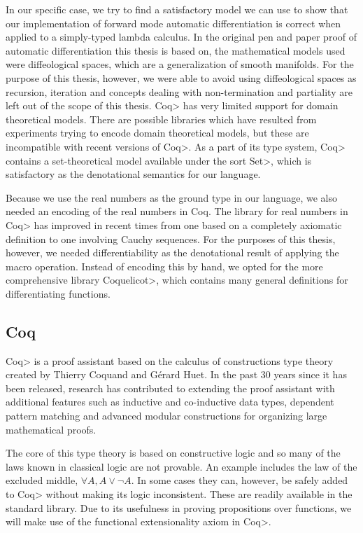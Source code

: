 \documentclass[11pt, final]{article}
\begin{document}
In our specific case, we try to find a satisfactory model we can use to show that our implementation of forward mode automatic differentiation is correct when applied to a simply-typed lambda calculus.
In the original pen and paper proof of automatic differentiation this thesis is based on, the mathematical models used were diffeological spaces, which are a generalization of smooth manifolds.
For the purpose of this thesis, however, we were able to avoid using diffeological spaces as recursion, iteration and concepts dealing with non-termination and partiality are left out of the scope of this thesis.
\<Coq> has very limited support for domain theoretical models.
There are possible libraries which have resulted from experiments trying to encode domain theoretical models\cite{Benton2009}\cite{Dockins2014}, but these are incompatible with recent versions of \<Coq>.
As a part of its type system, \<Coq> contains a set-theoretical model available under the sort \<Set>, which is satisfactory as the denotational semantics for our language.

Because we use the real numbers as the ground type in our language, we also needed an encoding of the real numbers in Coq. The library for real numbers in \<Coq> has improved in recent times from one based on a completely axiomatic definition to one involving Cauchy sequences. For the purposes of this thesis, however, we needed differentiability as the denotational result of applying the macro operation. Instead of encoding this by hand, we opted for the more comprehensive library \<Coquelicot>\cite{Boldo2015CoquelicotAU}, which contains many general definitions for differentiating functions.


\subsection{Coq}

\<Coq> is a proof assistant based on the calculus of constructions type theory created by Thierry Coquand and G\'{e}rard Huet\cite{Coquand1988}.
In the past 30 years since it has been released, research has contributed to extending the proof assistant with additional features such as inductive and co-inductive data types\cite{Coquand1990}, dependent pattern matching\cite{Sozeau2010} and advanced modular constructions for organizing large mathematical proofs\cite{Sozeau2008}\cite{Mahboubi2013}.

The core of this type theory is based on constructive logic and so many of the laws known in classical logic are not provable.
An example includes the law of the excluded middle, $\forall A, A \vee \neg A$.
In some cases they can, however, be safely added to \<Coq> without making its logic inconsistent. These are readily available in the standard library.
Due to its usefulness in proving propositions over functions, we will make use of the functional extensionality axiom in \<Coq>.
\end{document}
